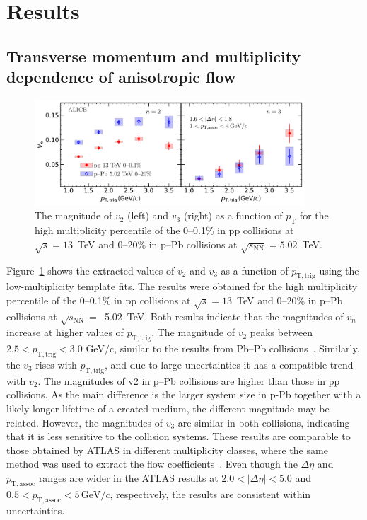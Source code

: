 
\section {Results}
\label{sec:results}
\subsection{Transverse momentum and multiplicity dependence of anisotropic flow}

\begin{figure}[h!]
	\centering
	\hspace{-3em}\includegraphics[width=0.9\textwidth]{figures/Fig2_vn_pppPb.pdf} %
	\caption{The magnitude of $v_2$ (left) and $v_3$ (right) as a function of $p_\mathrm{T}$ for the high multiplicity percentile of the 0--0.1\% in pp collisions at $\sqrt{s}=13$~TeV and 0--20\% in p--Pb collisions at $\sqrt{s_\mathrm{NN}} = 5.02$~TeV.}
	\label{fig:vn}
\end{figure}
Figure~\ref{fig:vn} shows the extracted values of $v_2$ and $v_3$ as a function of $p_{\mathrm{T,trig}}$ using the low-multiplicity template fits. The results were obtained for the high multiplicity percentile of the 0--0.1\% in pp collisions at $\sqrt{s}=13$~TeV and 0--20\% in p--Pb collisions at $\sqrt{s_\mathrm{NN}}=$~5.02~TeV. Both results indicate that the magnitudes of $v_n$ increase at higher values of $p_{\mathrm{T,trig}}$. The magnitude of $v_2$ peaks between $2.5<p_{\mathrm{T,trig}}<3.0$ GeV/c, similar to the results from Pb--Pb collisions~\cite{ALICE:2018yph}. Similarly, the $v_3$ rises with $p_{\mathrm{T,trig}}$, and due to large uncertainties it has a compatible trend with $v_2$.
The magnitudes of v2 in p--Pb collisions are higher than those in pp collisions. As the main difference is the larger system size in p-Pb together with a likely longer lifetime of a created medium, the different magnitude may be related.
However, the magnitudes of $v_3$ are similar in both collisions, indicating that it is less sensitive to the collision systems.
These results are comparable to those obtained by ATLAS in different multiplicity classes, where the same method was used to extract the flow coefficients~\cite{ATLAS:2016yzd}. Even though the $\Delta\eta$ and $p_{\mathrm{T,assoc}}$ ranges are wider in the ATLAS results at $2.0<|\Delta\eta|<5.0$ and $0.5<p_{\mathrm{T,assoc}}<5\,\mathrm{GeV}/c$, respectively, the results are consistent within uncertainties.

